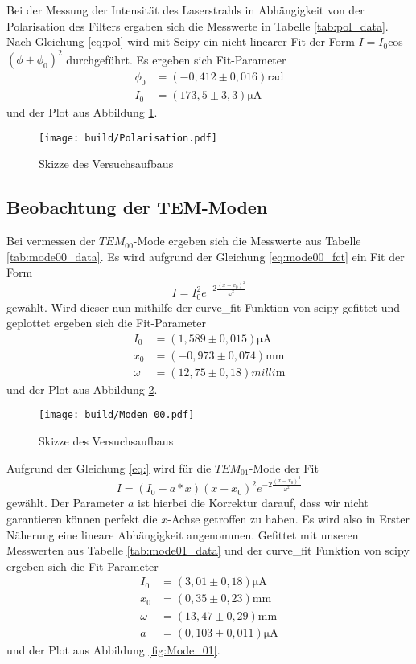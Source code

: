 Bei der Messung der Intensität des Laserstrahls in Abhängigkeit von der Polarisation des Filters ergaben sich die
Messwerte in Tabelle \ref{tab:pol_data}.
Nach Gleichung \ref{eq:pol} wird mit Scipy \cite{scipy} ein nicht-linearer Fit der Form $I = I_0$cos$(\phi+\phi_0)^2$ durchgeführt.
Es ergeben sich Fit-Parameter
\begin{align}
  \phi_0&=(-0,412\pm 0,016)\si{\radian}\nonumber\\
  I_0&=(173,5\pm 3,3)\si{\micro\ampere}\label{eqn:Parameter_Polarisation}
\end{align}
und der Plot aus Abbildung \ref{fig:Polarisation}.
\begin{figure}
  \centering
  \texttt{[image: build/Polarisation.pdf]}
  \caption{Skizze des Versuchsaufbaus}
  \label{fig:Polarisation}
\end{figure}


\subsection{Beobachtung der TEM-Moden}
Bei vermessen der $TEM_{00}$-Mode ergeben sich die Messwerte aus Tabelle \ref{tab:mode00_data}. 
Es wird aufgrund der Gleichung \eqref{eq:mode00_fct} ein Fit der Form
\begin{equation}
  I=I_0^2e^{-2\frac{(x-x_0)^2}{\omega^2}}
\end{equation}
gewählt. Wird dieser nun mithilfe der curve\_fit Funktion von scipy \cite{scipy} gefittet und geplottet ergeben sich die Fit-Parameter
\begin{align}
  I_0&=(1,589\pm0,015)\si{\micro\ampere}\nonumber\\
  x_0&=(-0,973\pm0,074)\si{\milli\meter}\nonumber\\
  \omega&=(12,75\pm0,18)\si{milli\meter}
\end{align}
und der Plot aus Abbildung \ref{fig:Mode_00}.
\begin{figure}
  \centering
  \texttt{[image: build/Moden\_00.pdf]}
  \caption{Skizze des Versuchsaufbaus}
  \label{fig:Mode_00}
\end{figure}
Aufgrund der Gleichung \eqref{eq:} wird für die $TEM_{01}$-Mode der Fit 
\begin{equation}
  I=(I_0-a*x)(x-x_0)^2e^{-2\frac{(x-x_0)^2}{\omega^2}}
\end{equation}
gewählt. Der Parameter $a$ ist hierbei die Korrektur darauf, dass wir nicht garantieren können perfekt die $x$-Achse getroffen zu haben.
Es wird also in Erster Näherung eine lineare Abhängigkeit angenommen.
Gefittet mit unseren Messwerten aus Tabelle \ref{tab:mode01_data} und der curve\_fit Funktion von scipy \cite{scipy} ergeben sich die Fit-Parameter 
\begin{align}
  I_0&=(3,01\pm0,18)\si{\micro\ampere}\nonumber\\
  x_0&=(0,35\pm0,23)\si{\milli\meter}\nonumber\\
  \omega&=(13,47\pm0,29)\si{\milli\meter}\nonumber\\
  a&=(0,103\pm0,011)\si{\micro\ampere}
\end{align}
und der Plot aus Abbildung \ref{fig:Mode_01}.

